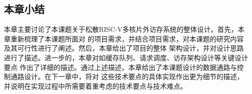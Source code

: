 \subsection{本章小结}

本章主要讨论了本课题关于松散RISC-V多核片外访存系统的整体设计。首先，本章重新梳理了本课题所面对
的项目需求，并结合项目需求，对本课题的研究内容及其可行性进行了阐述。然后，本章给出了项目的整体
架构设计，并对设计思路进行了描述。进一步的，本章对如缓存队列、请求调度、访存架构设计等关键设计要点
作出了详细的描述。通过上述描述，本章给出了本课题设计的数据通路与控制通路设计。在下一章中，将对
这些技术要点的具体实现作出更为细节的描述，并说明在实现过程中所需要着重考虑的技术要点与技术难点。
